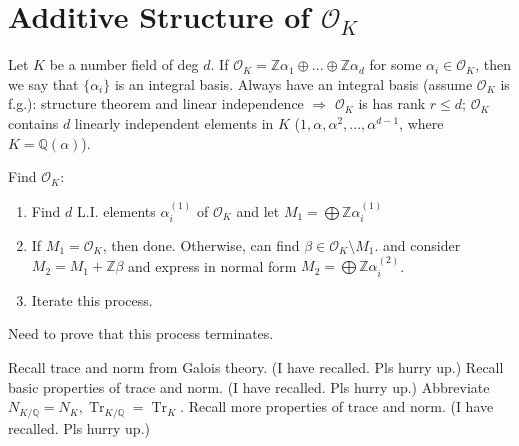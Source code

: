 \documentclass{article}
\theoremstyle{definition}
\theoremstyle{remark}
\theoremstyle{plain}
\newcommand{\ZZ}{\mathbb{Z}}
\newcommand{\QQ}{\mathbb{Q}}
\newcommand{\tr}{\operatorname{Tr}}
\begin{document}
\section{Additive Structure of $\mathcal{O}_K$}
Let $K$ be a number field of deg $d$. If $\mathcal O_K=\ZZ\alpha_1\oplus...\oplus\ZZ\alpha_d$ for some $\alpha_i\in \mathcal O_K$, then we say that $\{\alpha_i\}$ is an integral basis. Always have an integral basis (assume $\mathcal O_K$ is f.g.): structure theorem and linear independence $\Rightarrow$ $\mathcal O_K$ is has rank $r\le d$; $\mathcal O_K$ contains $d$ linearly independent elements in $K$ ($1,\alpha,\alpha^2,...,\alpha^{d-1}$, where $K=\QQ(\alpha)$).

Find $\mathcal O_K$:
\begin{enumerate}
    \item Find $d$ L.I. elements $\alpha_i^{(1)}$ of $\mathcal O_K$ and let $M_1=\bigoplus\ZZ\alpha_i^{(1)}$
    \item If $M_1=\mathcal O_K$, then done. Otherwise, can find $\beta\in\mathcal O_K\setminus M_1$. and consider $M_2=M_1+\ZZ\beta$ and express in normal form $M_2=\bigoplus\ZZ\alpha_i^{(2)}$.
    \item Iterate this process.
\end{enumerate}
Need to prove that this process terminates. 

Recall trace and norm from Galois theory. (I have recalled. Pls hurry up.) Recall basic properties of trace and norm. (I have recalled. Pls hurry up.) Abbreviate $N_{K/\QQ}=N_K,\tr_{K/\QQ}=\tr_K$. Recall more properties of trace and norm. (I have recalled. Pls hurry up.)

\end{document}
